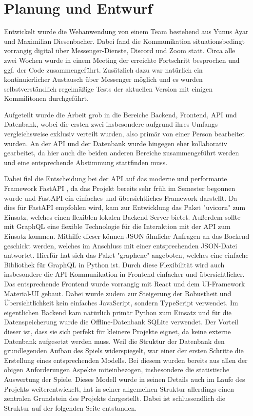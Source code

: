\section{Planung und Entwurf}

Entwickelt wurde die Webanwendung von einem Team bestehend aus Yunus Ayar und Maximilian Diesenbacher. Dabei fand die Kommunikation situationsbedingt vorrangig digital über Messenger-Dienste, Discord und Zoom statt. Circa alle zwei Wochen wurde in einem Meeting der erreichte Fortschritt besprochen und ggf. der Code zusammengeführt. Zusätzlich dazu war natürlich ein kontinuierlicher Austausch über Messenger möglich und es wurden selbstverständlich regelmäßige Tests der aktuellen Version mit einigen Kommilitonen durchgeführt.

Aufgeteilt wurde die Arbeit grob in die Bereiche Backend, Frontend, API und Datenbank, wobei die ersten zwei insbesondere aufgrund ihres Umfangs vergleichsweise exklusiv verteilt wurden, also primär von einer Person bearbeitet wurden. An der API und der Datenbank wurde hingegen eher kollaborativ gearbeitet, da hier auch die beiden anderen Bereiche zusammengeführt werden und eine entsprechende Abstimmung stattfinden muss.

Dabei fiel die Entscheidung bei der API auf das moderne und performante Framework FastAPI \cite{fastapi}, da das Projekt bereits sehr früh im Semester begonnen wurde und FastAPI ein einfaches und übersichtliches Framework darstellt. Da dies für FastAPI empfohlen wird, kam zur Entwicklung das Paket "uvicorn" \cite{uvicorn} zum Einsatz, welches einen flexiblen lokalen Backend-Server bietet. Außerdem sollte mit GraphQL \cite{graphql} eine flexible Technologie für die Interaktion mit der API zum Einsatz kommen. Mithilfe dieser können JSON-ähnliche Anfragen an das Backend geschickt werden, welches im Anschluss mit einer entsprechenden JSON-Datei antwortet. Hierfür hat sich das Paket "graphene" \cite{graphene} angeboten, welches eine einfache Bibliothek für GraphQL in Python ist. Durch diese Flexibilität wird auch insbesondere die API-Kommunikation in Frontend einfacher und übersichtlicher. Das entsprechende Frontend wurde vorrangig mit React \cite{react} und dem UI-Framework Material-UI \cite{material-ui} gebaut. Dabei wurde zudem zur Steigerung der Robustheit und Übersichtlichkeit kein einfaches JavaScript, sondern TypeScript verwendet. Im eigentlichen Backend kam natürlich primär Python zum Einsatz und für die Datenspeicherung wurde die Offline-Datenbank SQLite \cite{sqlite} verwendet. Der Vorteil dieser ist, dass sie sich perfekt für kleinere Projekte eignet, da keine externe Datenbank aufgesetzt werden muss. Weil die Struktur der Datenbank den grundlegenden Aufbau des Spiels widerspiegelt, war einer der ersten Schritte die Erstellung eines entsprechenden Modells. Bei diesem wurden bereits aus allen der obigen Anforderungen Aspekte miteinbezogen, insbesondere die statistische Auswertung der Spiele. Dieses Modell wurde in seinen Details auch im Laufe des Projekts weiterentwickelt, hat in seiner allgemeinen Struktur allerdings einen zentralen Grundstein des Projekts dargestellt. Dabei ist schlussendlich die Struktur auf der folgenden Seite entstanden.

